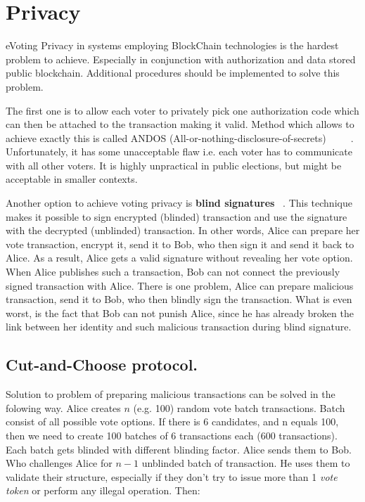 \documentclass[runningheads]{llncs}
\begin{document}
\section{Privacy}
\label{privacy}
eVoting Privacy in  systems employing BlockChain 
technologies is the hardest problem to achieve. 
Especially in conjunction with authorization and data stored public blockchain. Additional procedures should be implemented to  solve this problem. 

The first one is to allow each voter to privately pick one authorization code which can then be attached to the transaction making it valid. Method which allows to achieve exactly this is called ANDOS (All-or-nothing-disclosure-of-secrets) ~\cite{andos} ~\cite{salomaa1990secret} ~\cite{applied_cryptography}. Unfortunately, it has some unacceptable flaw i.e. each voter has to communicate with all other voters. It is 
highly unpractical in public elections, but might be acceptable in smaller contexts. 

Another option to achieve voting   privacy is \textbf{blind signatures} ~\cite{applied_cryptography}. This technique makes it possible to sign encrypted (blinded) transaction and use the signature with the decrypted (unblinded) transaction. In other words, Alice can prepare her vote transaction, encrypt it, send it to Bob, who then sign it and send it back to Alice. As a result, Alice gets a valid signature without revealing her vote option. When Alice publishes such a transaction, Bob can not connect the previously signed transaction with Alice. 
There is one problem, Alice can prepare malicious transaction, send it to Bob, who then blindly sign the transaction. What is even worst, is the fact that Bob can not punish Alice, since he has already broken the link between her identity and such malicious transaction during blind signature.

\subsection{Cut-and-Choose protocol.}
\label{cut-and-choose}

Solution to  problem of preparing 
malicious transactions can be solved in the folowing way.  
Alice creates \(n\) (e.g. 100) random vote batch transactions. Batch consist of all possible vote options. If there is 6 candidates, and n equals 100, then we need to create 100 batches of 6 transactions each (600 transactions). Each batch gets blinded with different blinding factor. Alice sends them to Bob. Who challenges Alice for \(n-1\) unblinded batch of transaction. He uses them to validate their structure, especially if they don't try to issue more than 1 \textit{vote token} or perform any illegal operation. Then:
\end{document}
